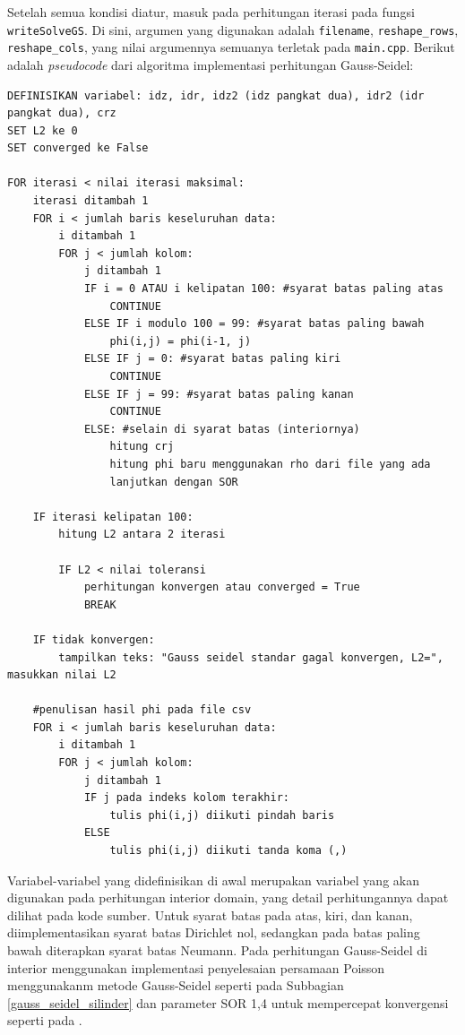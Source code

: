 Setelah semua kondisi diatur, masuk pada perhitungan iterasi pada fungsi \texttt{writeSolveGS}.
Di sini, argumen yang digunakan adalah \texttt{filename}, \texttt{reshape\_\texttt{\-}rows},
\texttt{reshape\_cols}, yang nilai argumennya semuanya terletak pada \texttt{main.cpp}.
Berikut adalah \textit{pseudocode} dari algoritma implementasi perhitungan Gauss-Seidel:
\begin{lstlisting}[breaklines=true, breakatwhitespace=true]
DEFINISIKAN variabel: idz, idr, idz2 (idz pangkat dua), idr2 (idr pangkat dua), crz
SET L2 ke 0
SET converged ke False

FOR iterasi < nilai iterasi maksimal:
    iterasi ditambah 1
    FOR i < jumlah baris keseluruhan data:
        i ditambah 1
        FOR j < jumlah kolom:
            j ditambah 1
            IF i = 0 ATAU i kelipatan 100: #syarat batas paling atas
                CONTINUE
            ELSE IF i modulo 100 = 99: #syarat batas paling bawah
                phi(i,j) = phi(i-1, j)
            ELSE IF j = 0: #syarat batas paling kiri
                CONTINUE
            ELSE IF j = 99: #syarat batas paling kanan
                CONTINUE
            ELSE: #selain di syarat batas (interiornya)
                hitung crj
                hitung phi baru menggunakan rho dari file yang ada
                lanjutkan dengan SOR

    IF iterasi kelipatan 100:
        hitung L2 antara 2 iterasi

        IF L2 < nilai toleransi
            perhitungan konvergen atau converged = True
            BREAK

    IF tidak konvergen:
        tampilkan teks: "Gauss seidel standar gagal konvergen, L2=", masukkan nilai L2

    #penulisan hasil phi pada file csv
    FOR i < jumlah baris keseluruhan data:
        i ditambah 1
        FOR j < jumlah kolom:
            j ditambah 1
            IF j pada indeks kolom terakhir:
                tulis phi(i,j) diikuti pindah baris
            ELSE
                tulis phi(i,j) diikuti tanda koma (,)
\end{lstlisting}

Variabel-variabel yang didefinisikan di awal merupakan variabel yang akan
digunakan pada perhitungan interior domain, yang detail perhitungannya dapat dilihat
pada kode sumber. Untuk syarat batas pada atas, kiri, dan kanan, diimplementasikan
syarat batas Dirichlet nol, sedangkan pada batas paling bawah diterapkan syarat
batas Neumann. Pada perhitungan Gauss-Seidel di interior menggunakan implementasi
penyelesaian persamaan Poisson menggunakanm metode Gauss-Seidel seperti pada Subbagian
\ref{gauss_seidel_silinder} dan parameter SOR 1,4 untuk mempercepat konvergensi seperti
pada \cite{lubos_brieda_2019}.

